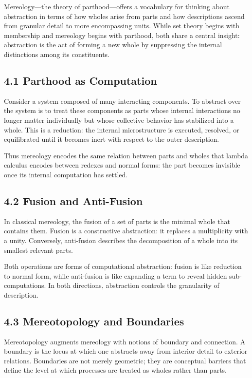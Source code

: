 \documentclass[12pt,letterpaper]{article}
\theoremstyle{remark}
\begin{document}
Mereology—the theory of parthood—offers a vocabulary for thinking about abstraction in terms of how wholes arise from parts and how descriptions ascend from granular detail to more encompassing units. While set theory begins with membership and mereology begins with parthood, both share a central insight: abstraction is the act of forming a new whole by suppressing the internal distinctions among its constituents.

\subsection{4.1 Parthood as Computation}

Consider a system composed of many interacting components. To abstract over the system is to treat these components as parts whose internal interactions no longer matter individually but whose collective behavior has stabilized into a whole. This is a reduction: the internal microstructure is executed, resolved, or equilibrated until it becomes inert with respect to the outer description.

Thus mereology encodes the same relation between parts and wholes that lambda calculus encodes between redexes and normal forms: the part becomes invisible once its internal computation has settled.

\subsection{4.2 Fusion and Anti-Fusion}

In classical mereology, the fusion of a set of parts is the minimal whole that contains them. Fusion is a constructive abstraction: it replaces a multiplicity with a unity. Conversely, anti-fusion describes the decomposition of a whole into its smallest relevant parts.

Both operations are forms of computational abstraction: fusion is like reduction to normal form, while anti-fusion is like expanding a term to reveal hidden sub-computations. In both directions, abstraction controls the granularity of description.

\subsection{4.3 Mereotopology and Boundaries}

Mereotopology augments mereology with notions of boundary and connection. A boundary is the locus at which one abstracts away from interior detail to exterior relations. Boundaries are not merely geometric; they are conceptual barriers that define the level at which processes are treated as wholes rather than parts.
\end{document}
